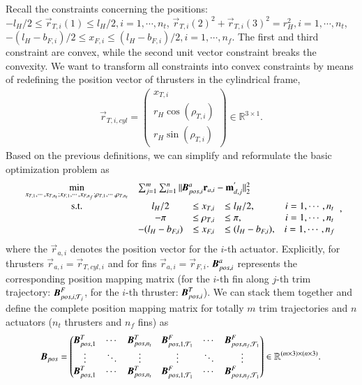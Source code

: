 Recall the constraints concerning the positions: $-l_{H}/2\leq \vec{r}_{T,i}(1) \leq l_{H}/2, i=1, \cdots, n_{t}$, $\vec{r}_{T,i}(2)^{2}+\vec{r}_{T,i}(3)^{2} =r_{H}^{2}, i=1, \cdots, n_{t}$, $-(l_{H}-b_{F,i})/2\leq x_{F,i} \leq (l_{H}-b_{F,i})/2, i=1, \cdots, n_{f}$. The first and third constraint are convex, while the second unit vector constraint breaks the convexity. We want to transform all constraints into convex constraints by means of redefining the position vector of thrusters in the cylindrical frame,
\begin{align}
\vec{r}_{T,i,cyl}=
\begin{pmatrix}
x_{T,i} \\ r_{H}\cos(\rho_{T,i}) \\ r_{H}\sin(\rho_{T,i})
\end{pmatrix} \in \mathbb{R}^{3 \times 1}.
\end{align}
Based on the previous definitions, we can simplify and reformulate the basic optimization problem as 
\begin{equation}
\begin{array}{ccclcl}
\displaystyle \min_{x_{T,1}, \cdots, x_{T,n_{t}}; x_{F,1}, \cdots, x_{F,n_{f}}; \rho_{T,1}, \cdots, \rho_{T,n_{t}} } & \multicolumn{3}{l}{\sum_{j=1}^{m}\sum_{i=1}^{n}||\emph{\textbf{B}}_{pos,i}^{a}\vec{r}_{a,i}-\vec{m}_{d,j}^{'}||^{2}_{2}} \\
\textrm{s.t.}
& l_{H}/2&\leq x_{T,i} & \leq l_{H}/2, &i=1, \cdots, n_{t} \\
& -\pi&\leq \rho_{T,i} & \leq \pi, &i=1, \cdots, n_{t} \\
& -(l_{H}-b_{F,i})&\leq x_{F,i} &\leq (l_{H}-b_{F,i}), &i=1, \cdots, n_{f} \\
\end{array}, \label{EQ:OPTPos}
\end{equation}
where the $\vec{r}_{a,i}$ denotes the position vector for the $i$-th actuator. Explicitly, for thrusters $\vec{r}_{a,i}=\vec{r}_{T,cyl,i}$ and for fins $\vec{r}_{a,i}=\vec{r}_{F,i}$. $\emph{\textbf{B}}_{pos,i}^{a}$ represents the corresponding position mapping matrix (for the $i$-th fin along $j$-th trim trajectory: $\emph{\textbf{B}}_{pos,i,\mathcal{T}_{j}}^{F}$, for the $i$-th thruster: $\emph{\textbf{B}}_{pos,i}^{T}$).
We can stack them together and define the complete position mapping matrix for totally $m$ trim trajectories and $n$ actuators ($n_{t}$ thrusters and $n_{f}$ fins) as 
\begin{align}
\emph{\textbf{B}}_{pos}=
\begin{pmatrix}
    \emph{\textbf{B}}_{pos,1}^{T} & \cdots & \emph{\textbf{B}}_{pos,n_{t}}^{T}&
     \emph{\textbf{B}}_{pos,1,\mathcal{T}_{1}}^{F} & \cdots & \emph{\textbf{B}}_{pos,n_{f},\mathcal{T}_{1}}^{F}\\
     \vdots & \ddots & \vdots&\vdots&\ddots&\vdots \\
    \emph{\textbf{B}}_{pos,1}^{T} & \cdots & \emph{\textbf{B}}_{pos,n_{t}}^{T}&
     \emph{\textbf{B}}_{pos,1,\mathcal{T}_{1}}^{F} & \cdots & \emph{\textbf{B}}_{pos,n_{f},\mathcal{T}_{1}}^{F}
\end{pmatrix}\in \mathbb{R}^{(m\times3)\times (n\times 3)}.
\end{align} 
